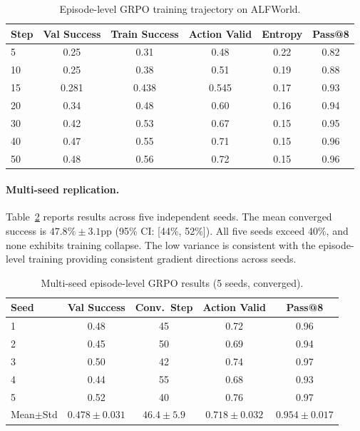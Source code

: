 \documentclass[10pt]{article}
\begin{document}
\begin{table}[h]
\centering
\caption{Episode-level GRPO training trajectory on ALFWorld.}
\label{tab:convergence}
\begin{tabular}{lccccc}
\toprule
Step & Val Success & Train Success & Action Valid & Entropy & Pass@8 \\
\midrule
5    & 0.25 & 0.31 & 0.48 & 0.22 & 0.82 \\
10   & 0.25 & 0.38 & 0.51 & 0.19 & 0.88 \\
15   & 0.281 & 0.438 & 0.545 & 0.17 & 0.93 \\
20   & 0.34 & 0.48 & 0.60 & 0.16 & 0.94 \\
30   & 0.42 & 0.53 & 0.67 & 0.15 & 0.95 \\
40   & 0.47 & 0.55 & 0.71 & 0.15 & 0.96 \\
50   & 0.48 & 0.56 & 0.72 & 0.15 & 0.96 \\
\bottomrule
\end{tabular}
\end{table}

\paragraph{Multi-seed replication.}
Table~\ref{tab:multiseed} reports results across five independent seeds. The mean converged success is $47.8\% \pm 3.1$pp (95\% CI: [44\%, 52\%]). All five seeds exceed 40\%, and none exhibits training collapse. The low variance is consistent with the episode-level training providing consistent gradient directions across seeds.

\begin{table}[h]
\centering
\caption{Multi-seed episode-level GRPO results (5 seeds, converged).}
\label{tab:multiseed}
\begin{tabular}{lcccc}
\toprule
Seed & Val Success & Conv.\ Step & Action Valid & Pass@8 \\
\midrule
1 & 0.48 & 45 & 0.72 & 0.96 \\
2 & 0.45 & 50 & 0.69 & 0.94 \\
3 & 0.50 & 42 & 0.74 & 0.97 \\
4 & 0.44 & 55 & 0.68 & 0.93 \\
5 & 0.52 & 40 & 0.76 & 0.97 \\
\midrule
Mean$\pm$Std & $0.478 \pm 0.031$ & $46.4 \pm 5.9$ & $0.718 \pm 0.032$ & $0.954 \pm 0.017$ \\
\bottomrule
\end{tabular}
\end{table}
\end{document}
